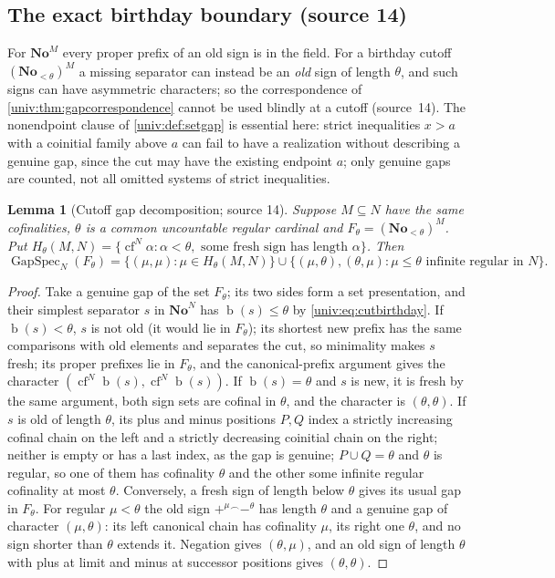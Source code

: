 \documentclass[11pt,letterpaper]{article}
\numberwithin{equation}{section}
\newtheorem{lemma}[lemma]{Lemma}
\theoremstyle{definition}
\theoremstyle{remark}
\newcommand{\No}{\mathbf{No}}
\newcommand{\NoM}{\No^{M}}
\newcommand{\NoN}{\No^{N}}
\newcommand{\bd}{\operatorname{b}}
\newcommand{\cf}{\operatorname{cf}}
\newcommand{\GapSpec}{\operatorname{GapSpec}}
\newcommand{\cat}{\mathbin{{}^{\frown}}}
\begin{document}
\subsection{The exact birthday boundary (source 14)}

For $\NoM$ every proper prefix of an old sign is in the field. For a birthday cutoff
$(\No_{<\theta})^M$ a missing separator can instead be an \emph{old} sign of length
$\theta$, and such signs can have asymmetric characters; so the correspondence of
\cref{univ:thm:gapcorrespondence} cannot be used blindly at a cutoff (source~14). The
nonendpoint clause of \cref{univ:def:setgap} is essential here: strict inequalities $x>a$
with a coinitial family above $a$ can fail to have a realization without describing a
genuine gap, since the cut may have the existing endpoint $a$; only genuine gaps are
counted, not all omitted systems of strict inequalities.

\begin{lemma}[Cutoff gap decomposition; source 14]\label{univ:gs:lem:boundary}
Suppose $M\subseteq N$ have the same cofinalities, $\theta$ is a common uncountable regular
cardinal and $F_\theta=(\No_{<\theta})^M$. Put
$H_\theta(M,N)=\{\cf^N\alpha:\alpha<\theta,\text{ some fresh sign has length }\alpha\}$. Then
\[
 \GapSpec_N(F_\theta)=\{(\mu,\mu):\mu\in H_\theta(M,N)\}\cup
 \{(\mu,\theta),(\theta,\mu):\mu\le\theta\text{ infinite regular in }N\}.
\]
\end{lemma}
\begin{proof}
Take a genuine gap of the set $F_\theta$; its two sides form a set presentation, and their
simplest separator $s$ in $\NoN$ has $\bd(s)\le\theta$ by \eqref{univ:eq:cutbirthday}. If
$\bd(s)<\theta$, $s$ is not old (it would lie in $F_\theta$); its shortest new prefix has
the same comparisons with old elements and separates the cut, so minimality makes $s$ fresh;
its proper prefixes lie in $F_\theta$, and the canonical-prefix argument gives the character
$(\cf^N\bd(s),\cf^N\bd(s))$. If $\bd(s)=\theta$ and $s$ is new, it is fresh by the same
argument, both sign sets are cofinal in $\theta$, and the character is $(\theta,\theta)$. If
$s$ is old of length $\theta$, its plus and minus positions $P,Q$ index a strictly increasing
cofinal chain on the left and a strictly decreasing coinitial chain on the right; neither is
empty or has a last index, as the gap is genuine; $P\cup Q=\theta$ and $\theta$ is regular, so
one of them has cofinality $\theta$ and the other some infinite regular cofinality at most
$\theta$. Conversely, a fresh sign of length below $\theta$ gives its usual gap in $F_\theta$.
For regular $\mu<\theta$ the old sign $+^\mu\cat-^\theta$ has length $\theta$ and a genuine
gap of character $(\mu,\theta)$: its left canonical chain has cofinality $\mu$, its right one
$\theta$, and no sign shorter than $\theta$ extends it. Negation gives $(\theta,\mu)$, and an
old sign of length $\theta$ with plus at limit and minus at successor positions gives
$(\theta,\theta)$.
\end{proof}
\end{document}
